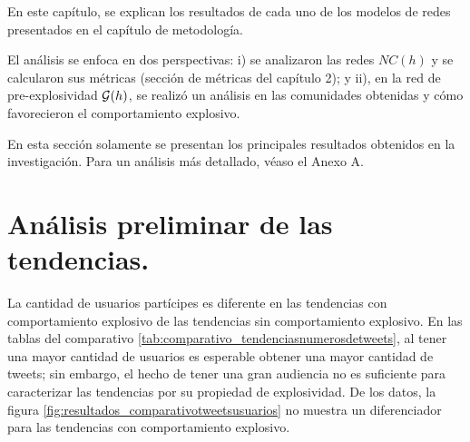 \documentclass[../main.tex]{subfiles}
\begin{document}
\onehalfspacing

En este capítulo, se explican los resultados de cada uno de los modelos de redes presentados en el capítulo de metodología.


El análisis se enfoca en dos perspectivas: i) se analizaron las redes $NC(h)$ y se calcularon sus métricas (sección de métricas del capítulo 2); y ii), en la red de pre-explosividad $\mathcal{G}(h)$, se realizó un análisis en las comunidades obtenidas y cómo favorecieron el comportamiento explosivo.

En esta sección solamente se presentan los principales resultados obtenidos en la investigación. Para un análisis más detallado, véaso el Anexo A.


\section{Análisis preliminar de las tendencias.}

La cantidad de usuarios partícipes es diferente en las tendencias con comportamiento explosivo de las tendencias sin comportamiento explosivo.  En las tablas del comparativo \ref{tab:comparativo_tendenciasnumerosdetweets}, al tener una mayor cantidad de usuarios es esperable obtener una mayor cantidad de tweets; sin embargo, el hecho de tener una gran audiencia no es suficiente para caracterizar las tendencias por su propiedad de explosividad.  De los datos, la figura \ref{fig:resultados_comparativotweetsusuarios} no muestra un diferenciador para las tendencias con comportamiento explosivo. 
\end{document}

